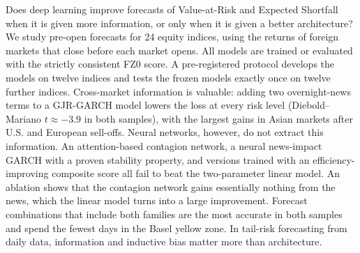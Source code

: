 Does deep learning improve forecasts of Value-at-Risk and Expected Shortfall when it is given more information, or only when it is given a better architecture? We study pre-open forecasts for 24 equity indices, using the returns of foreign markets that close before each market opens. All models are trained or evaluated with the strictly consistent FZ0 score. A pre-registered protocol develops the models on twelve indices and tests the frozen models exactly once on twelve further indices. Cross-market information is valuable: adding two overnight-news terms to a GJR-GARCH model lowers the loss at every risk level (Diebold--Mariano $t\approx-3.9$ in both samples), with the largest gains in Asian markets after U.S. and European sell-offs. Neural networks, however, do not extract this information. An attention-based contagion network, a neural news-impact GARCH with a proven stability property, and versions trained with an efficiency-improving composite score all fail to beat the two-parameter linear model. An ablation shows that the contagion network gains essentially nothing from the news, which the linear model turns into a large improvement. Forecast combinations that include both families are the most accurate in both samples and spend the fewest days in the Basel yellow zone. In tail-risk forecasting from daily data, information and inductive bias matter more than architecture.
